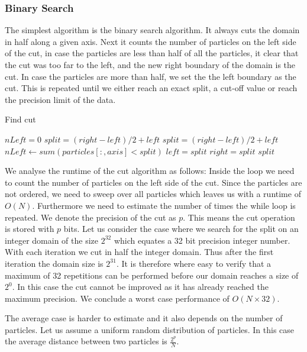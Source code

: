 \documentclass[]{article}
\begin{document}
\subsubsection{Binary Search}
The simplest algorithm is the binary search algorithm. It always cuts the domain in half along a given axis. Next it counts the number of particles on the left side of the cut, in case the particles are less than half of all the particles, it clear that the cut was too far to the left, and the new right boundary of the domain is the cut. In case the particles are more than half, we set the the left boundary as the cut. This is repeated until we either reach an exact split, a cut-off value or reach the precision limit of the data.


\begin{algorithm}[H]
	\caption{Find cut}\label{algo:cut}
	\begin{algorithmic}[1]
		\State $nLeft = 0$
		\State $split = (right - left) / 2 + left $ 
		\State $split = (right - left) / 2 + left $
		\State $nLeft\gets sum(particles[:,axis] < split)$
		\State $left = split$
		\Else 
		\State $right = split$
		\EndIf
		\EndWhile\label{euclidendwhile}
		\State \Return $split$
		\EndProcedure
	\end{algorithmic}
\end{algorithm}

We analyse the runtime of the cut algorithm as follows: Inside the loop we need to count the number of particles on the left side of the cut. Since the particles are not ordered, we need to sweep over all particles which leaves us with a runtime of $O(N)$. Furthermore we need to estimate the number of times the while loop is repeated. We denote the precision of the cut as $p$. This means the cut operation is stored with $p$ bits. 
Let us consider the case where we search for the split on an integer domain of the size $2^{32}$ which equates a 32 bit precision integer number. With each iteration we cut in half the integer domain. Thus after the first iteration the domain size is $2^{31}$. It is therefore where easy to verify that a maximum of 32 repetitions can be performed before our domain reaches a size of $2^0$. In this case the cut cannot be improved as it has already reached the maximum precision. We conclude a worst case performance of $O(N \times 32)$. 

The average case is harder to estimate and it also depends on the number of particles. Let us assume a uniform random distribution of particles. In this case the average distance between two particles is $\frac{2^{p}}{N}$. 
\end{document}
